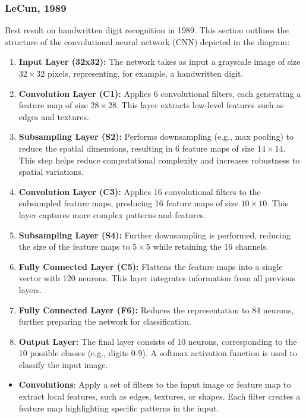 \subsubsection{LeCun, 1989}
\begin{example}
    Best result on handwritten digit recognition in 1989. This section outlines the structure of the convolutional neural network (CNN) depicted in the diagram:

    \begin{enumerate}
        \item \textbf{Input Layer (32x32):} 
        The network takes as input a grayscale image of size $32 \times 32$ pixels, representing, for example, a handwritten digit.
    
        \item \textbf{Convolution Layer (C1):} 
        Applies 6 convolutional filters, each generating a feature map of size $28 \times 28$. This layer extracts low-level features such as edges and textures.
        
        \item \textbf{Subsampling Layer (S2):} 
        Performs downsampling (e.g., max pooling) to reduce the spatial dimensions, resulting in 6 feature maps of size $14 \times 14$. This step helps reduce computational complexity and increases robustness to spatial variations.
        
        \item \textbf{Convolution Layer (C3):} 
        Applies 16 convolutional filters to the subsampled feature maps, producing 16 feature maps of size $10 \times 10$. This layer captures more complex patterns and features.
        
        \item \textbf{Subsampling Layer (S4):} 
        Further downsampling is performed, reducing the size of the feature maps to $5 \times 5$ while retaining the 16 channels.
        
        \item \textbf{Fully Connected Layer (C5):} 
        Flattens the feature maps into a single vector with 120 neurons. This layer integrates information from all previous layers.
        
        \item \textbf{Fully Connected Layer (F6):} 
        Reduces the representation to 84 neurons, further preparing the network for classification.
        
        \item \textbf{Output Layer:} 
        The final layer consists of 10 neurons, corresponding to the 10 possible classes (e.g., digits 0-9). A softmax activation function is used to classify the input image.
    \end{enumerate}
    \begin{itemize}
        \item \textbf{Convolutions}: Apply a set of filters to the input image or feature map to extract local features, such as edges, textures, or shapes. Each filter creates a feature map highlighting specific patterns in the input.
    

\end{itemize}
\end{example}
